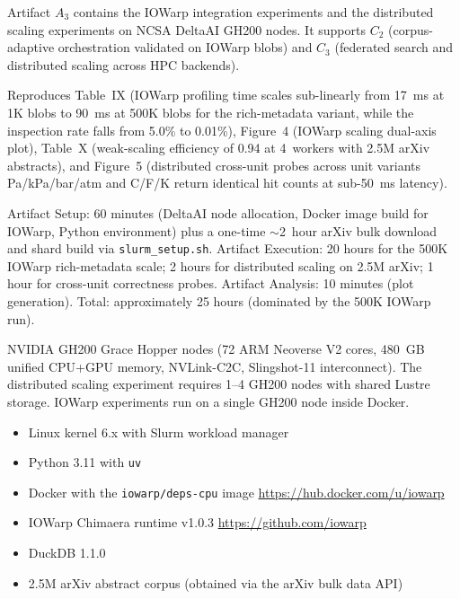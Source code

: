 \documentclass[conference]{IEEEtran}
\begin{document}

\newartifact

\artrel

Artifact $A_3$ contains the IOWarp integration experiments and the distributed scaling experiments on NCSA DeltaAI GH200 nodes. It supports $C_2$ (corpus-adaptive orchestration validated on IOWarp blobs) and $C_3$ (federated search and distributed scaling across HPC backends).

\artexp

Reproduces Table~IX (IOWarp profiling time scales sub-linearly from 17~ms at 1K blobs to 90~ms at 500K blobs for the rich-metadata variant, while the inspection rate falls from 5.0\% to 0.01\%), Figure~4 (IOWarp scaling dual-axis plot), Table~X (weak-scaling efficiency of 0.94 at 4~workers with 2.5M arXiv abstracts), and Figure~5 (distributed cross-unit probes across unit variants Pa/kPa/bar/atm and \textdegree C/\textdegree F/K return identical hit counts at sub-50~ms latency).

\arttime

Artifact Setup: 60 minutes (DeltaAI node allocation, Docker image build for IOWarp, Python environment) plus a one-time $\sim$2~hour arXiv bulk download and shard build via \texttt{slurm\_setup.sh}.
Artifact Execution: 20 hours for the 500K IOWarp rich-metadata scale; 2 hours for distributed scaling on 2.5M arXiv; 1 hour for cross-unit correctness probes.
Artifact Analysis: 10 minutes (plot generation).
Total: approximately 25 hours (dominated by the 500K IOWarp run).

\artin


NVIDIA GH200 Grace Hopper nodes (72 ARM Neoverse V2 cores, 480~GB unified CPU+GPU memory, NVLink-C2C, Slingshot-11 interconnect). The distributed scaling experiment requires 1--4 GH200 nodes with shared Lustre storage. IOWarp experiments run on a single GH200 node inside Docker.


\begin{itemize}
\item Linux kernel 6.x with Slurm workload manager
\item Python 3.11 with \texttt{uv}
\item Docker with the \texttt{iowarp/deps-cpu} image \url{https://hub.docker.com/u/iowarp}
\item IOWarp Chimaera runtime v1.0.3 \url{https://github.com/iowarp}
\item DuckDB 1.1.0
\item 2.5M arXiv abstract corpus (obtained via the arXiv bulk data API)
\end{itemize}
\end{document}
